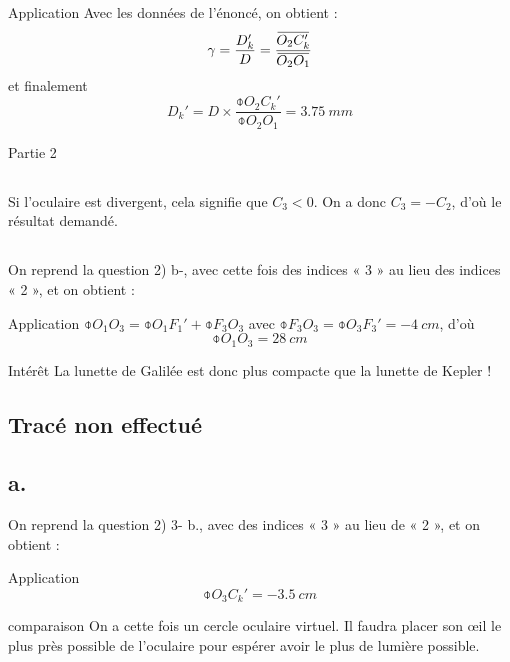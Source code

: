 \documentclass[10pt,a5paper,notitlepage]{book}
\begin{document}
\begin{NCexem}{Application}
    Avec les données de l'énoncé, on obtient :
    \[ \g = \frac{D_k'}{D} = \frac{\obar{O_2C_k'}}{\obar{O_2O_1}}\]
    et finalement
    \[ \boxed{D_k' = D\times \frac{\obar{O_2C_k'}}{\obar{O_2O_1}} =
    \SI{3.75}{mm}} \]
\end{NCexem}

\begin{center}
    \huge Partie 2
\end{center}

\subsection{}
Si l'oculaire est divergent, cela signifie que $C_3 < 0$. On a donc $C_3 = -
C_2$, d'où le résultat demandé.

\subsection{}
On reprend la question 2) b-, avec cette fois des indices « 3 » au lieu des
indices « 2 », et on obtient :

\begin{NCexem}{Application}
    $\obar{O_1O_3} = \obar{O_1F_1'} + \obar{F_3O_3}$ avec $\obar{F_3O_3} =
    \obar{O_3F_3'} = \SI{-4}{cm}$, d'où
    \[ \boxed{\obar{O_1O_3} = \SI{+28}{cm}} \]
\end{NCexem}

\begin{inte}{Intérêt}
    La lunette de Galilée est donc plus compacte que la lunette de Kepler !
\end{inte}

\subsection{Tracé non effectué}

\subsection{a.}
On reprend la question 2) 3- b., avec des indices « 3 » au lieu de « 2 », et on
obtient :
\begin{NCexem}{Application}
    \[ \boxed{\obar{O_3C_k'} = \SI{-3.5}{cm}}\]
\end{NCexem}

\begin{rema}{comparaison}
    On a cette fois un cercle oculaire virtuel. Il faudra placer son œil le plus
    près possible de l'oculaire pour espérer avoir le plus de lumière possible.
\end{rema}
\end{document}
